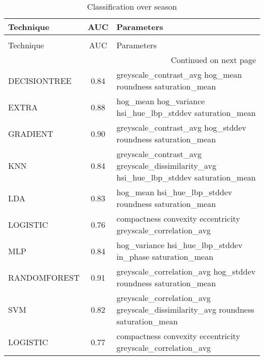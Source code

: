 \begin{longtable}{lcl}
\caption[Classification over season]{Classification over season}
\label{table:results-season}\\
\toprule
   Technique &  AUC &                                                                            Parameters \\
\midrule
\endfirsthead
\caption[]{Classification over season} \\
\toprule
   Technique &  AUC &                                                                            Parameters \\
\midrule
\endhead
\midrule
\multicolumn{3}{r}{{Continued on next page}} \\
\midrule
\endfoot

\bottomrule
\endlastfoot
DECISIONTREE & 0.84 &                             greyscale\_contrast\_avg hog\_mean roundness saturation\_mean \\
       EXTRA & 0.88 &                              hog\_mean hog\_variance hsi\_hue\_lbp\_stddev saturation\_mean \\
    GRADIENT & 0.90 &                           greyscale\_contrast\_avg hog\_stddev roundness saturation\_mean \\
         KNN & 0.84 & greyscale\_contrast\_avg greyscale\_dissimilarity\_avg hsi\_hue\_lbp\_stddev saturation\_mean \\
         LDA & 0.83 &                                 hog\_mean hsi\_hue\_lbp\_stddev roundness saturation\_mean \\
    LOGISTIC & 0.76 &                          compactness convexity eccentricity greyscale\_correlation\_avg \\
         MLP & 0.84 &                              hog\_variance hsi\_hue\_lbp\_stddev in\_phase saturation\_mean \\
RANDOMFOREST & 0.91 &                        greyscale\_correlation\_avg hog\_stddev roundness saturation\_mean \\
         SVM & 0.82 &       greyscale\_correlation\_avg greyscale\_dissimilarity\_avg roundness saturation\_mean \\
    LOGISTIC & 0.77 &                          compactness convexity eccentricity greyscale\_correlation\_avg \\
\end{longtable}
